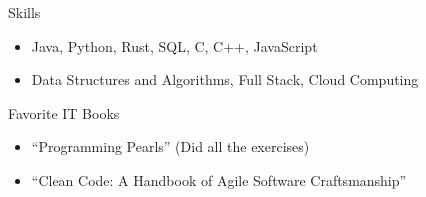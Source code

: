 \documentclass[]{mcdowellcv}
\begin{document}
	\begin{cvsection}{Skills}
		\begin{cvsubsection}{}{}{}
			\begin{itemize}
				\item Java, Python, Rust, SQL, C, C++, JavaScript
				\item Data Structures and Algorithms, Full Stack, Cloud Computing
			\end{itemize}
		\end{cvsubsection}
	\end{cvsection}
	
	\begin{cvsection}{Favorite IT Books}
		\begin{cvsubsection}{}{}{}
			\begin{itemize}
				\item ``Programming Pearls'' (Did all the exercises)
				\item ``Clean Code: A Handbook of Agile Software Craftsmanship''
			\end{itemize}
		\end{cvsubsection}
	\end{cvsection}
	
\end{document}
